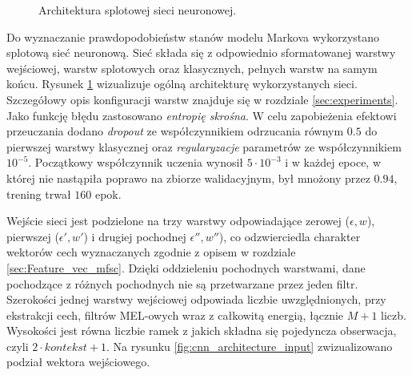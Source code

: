 \documentclass[11pt]{article}
\begin{document}
\begin{figure}[H]
		\label{fig:cnn_architecture_1}
		\caption{Architektura splotowej sieci neuronowej.}
	\end{figure}

	Do wyznaczanie prawdopodobieństw stanów modelu Markova wykorzystano splotową sieć neuronową. Sieć składa się z odpowiednio sformatowanej warstwy wejściowej, warstw splotowych oraz klasycznych, pełnych warstw na samym końcu. Rysunek \ref{fig:cnn_architecture_1} wizualizuje ogólną architekturę wykorzystanych sieci. Szczegółowy opis konfiguracji warstw znajduje się w rozdziale \ref{sec:experiments}. Jako funkcję błędu zastosowano \textit{entropię skrośna}. W celu zapobieżenia efektowi przeuczania dodano \textit{dropout} ze współczynnikiem odrzucania równym $0.5$ do pierwszej warstwy klasycznej oraz \textit{regularyzacje} parametrów ze współczynnikiem $10^{-5}$. Początkowy współczynnik uczenia wynosił $5 \cdot 10^{-3}$ i w każdej epoce, w której nie nastąpiła poprawo na zbiorze walidacyjnym, był mnożony przez $0.94$, trening trwał $160$ epok.
	
	Wejście sieci jest podzielone na trzy warstwy odpowiadające zerowej ($\epsilon, w$), pierwszej ($\epsilon', w'$) i drugiej pochodnej $\epsilon'', w''$), co odzwierciedla charakter wektorów cech wyznaczanych zgodnie z opisem w rozdziale \ref{sec:Feature_vec_mfsc}. Dzięki oddzieleniu pochodnych warstwami, dane pochodzące z różnych pochodnych nie są przetwarzane przez jeden filtr. Szerokości jednej warstwy wejściowej odpowiada liczbie uwzględnionych, przy ekstrakcji cech, filtrów MEL-owych wraz z całkowitą energią, łącznie $M+1$ liczb. Wysokości jest równa liczbie ramek z jakich składna się pojedyncza obserwacja, czyli $2\cdot kontekst + 1$. Na rysunku \ref{fig:cnn_architecture_input} zwizualizowano podział wektora wejściowego. 
	
\end{document}
